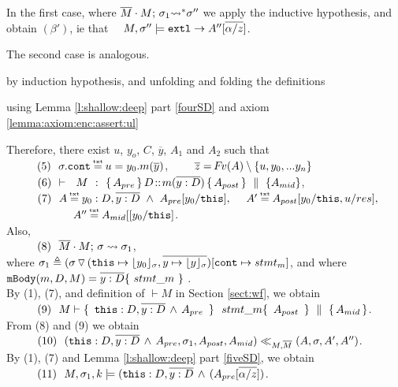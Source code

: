 {\begin{description}
In the first case, where $\overline{M}\cdot M;\, {\sigma_1} {\rightsquigarrow^*} \sigma''$ we apply the inductive hypothesis, and obtain $(\beta')$, ie that \ \ $ M, \sigma'' \models \mbox{\normalfont{\texttt{extl}}} \rightarrow A''[\overline{\alpha/z}]$.

 The second case is analogous.
 
  \item[{\sc{combine}}]  by induction hypothesis, and unfolding and folding the definitions
  
 \item[{\sc{consequ}}]  using Lemma \ref{l:shallow:deep} part \ref{fourSD}  and axiom \ref{lemma:axiom:enc:assert:ul}

%
%
\item[{\sc{Call\_Int}}]
 
 Therefore, there exist $u$, $y_o$, $C$, $\overline y$,  $A_1$ and $A_2$ such that \\
 $\SPS (5) \ \ \sigma.\prg{cont}\txteq u=y_0.m(\overline y)$,  \ \ \ \ $\overline z = {\hspace{-1pt}F\hspace{-1pt}}v(A)\setminus \{ u, y_0, ... y_n \}$
\\ 
$\strut \ \ \hspace{0.5cm} \ \  (6) \  \ {\vdash \ \ M\ \ \mathbf{:}\ \  \{\, A_{pre}\, \}\, D\!::\!m(\overline{y:D})\, \{\, A_{post}\, \} \, \,\parallel\,\, \{ A_{mid} \}}$, \\
$\SPS (7) \  \ A \txteq y_0:D ,\overline {y:D}\ \wedge \  A_{pre}[y_0/\prg{this}],\ \  \ \ 
A'  \txteq A_{post}[y_0/\prg{this},u/res],$\\
$\strut \hspace{2cm}  \  A'' \txteq  A_{mid}[[y_0/\prg{this}]$. 
\\
Also, \\
$\strut \ \ \hspace{0.5cm} \ \  (8) \ \ \overline{M}\cdot M;\, {\sigma} \rightsquigarrow \sigma_1$, \\
 where $\sigma_1\triangleq ( \sigma \, {\triangledown}\,  (\mbox{\normalfont{\texttt{this}}}\mapsto {\lfloor y_0 \rfloor_{\sigma}},{\overline{y \mapsto {\lfloor y \rfloor_{\sigma}}}}) [\mbox{\normalfont{\texttt{cont}}}\mapsto stmt_m]$, and where 
  $\prg{mBody}(m,D,M)=\overline{y:D}\{\    stmt\_m\ \}$ .\\
By (1), (7), and definition of $\vdash M$ in Section \ref{sect:wf}, we obtain\\
$\SPS (9) \ \ M \vdash  \quadruple { \ \prg{this}:D,\overline{y:D}\, \wedge\, A_{pre}\  } {\ stmt\_m } {\ A_{post}\ } {A_{mid}}$.\\
From (8) and (9) we obtain  \\
$\strut \ \ \hspace{0.5cm} \ \  (10) \ \ (\mbox{\normalfont{\texttt{this}}}:D,\overline{y:D}\, \wedge\, A_{pre},\sigma_1,A_{post}, A_{mid}) \ll_{M,\overline{M}} (A,\sigma,A', A'')$. 
\\
By (1), (7) and Lemma   \ref{l:shallow:deep} part \ref{fiveSD}, we obtain\\
$\strut \ \ \hspace{0.5cm} \ \  (11) \ \  M,\sigma_1 ,{k} \models {(\mbox{\normalfont{\texttt{this}}}:D,\overline{y:D}\, \wedge\, (A_{pre}[\overline{\alpha/z}])} $.


\end{description}}
